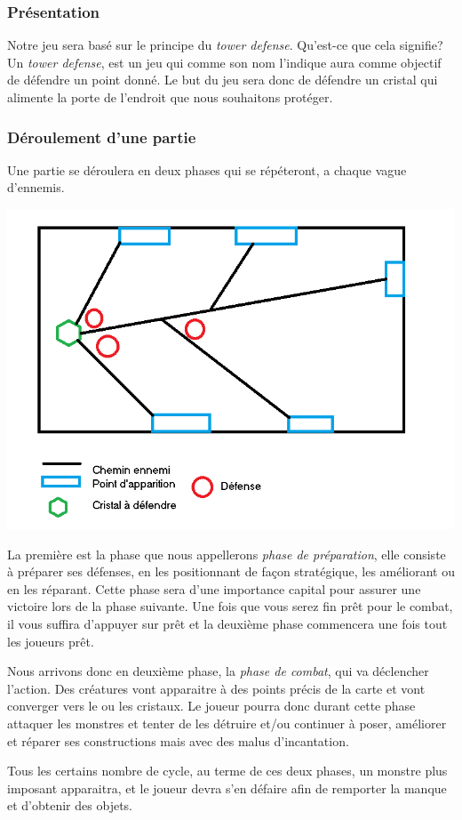 \documentclass[a4paper, 12pt]{article}
\begin{document}
		\subsubsection{Présentation}
		\par Notre jeu sera basé sur le principe du \textit{tower defense}. Qu'est-ce que 			cela signifie? Un \textit{tower defense}, est un jeu qui comme son nom l'indique 			aura comme objectif de défendre un point donné. Le but du jeu sera donc de défendre 		un cristal qui alimente la porte de l'endroit que nous souhaitons protéger.  
		\subsubsection{Déroulement d'une partie}
		Une partie se déroulera en deux phases qui se répéteront, a chaque vague d'ennemis.\\
		\centerline{\includegraphics[scale=0.55]{Plan.png}}
		\par La première est la phase que nous appellerons \textit{phase de préparation}, elle consiste à préparer ses défenses, en les positionnant de façon stratégique, les améliorant ou en les réparant. Cette phase sera d'une importance capital pour assurer une victoire lors de la phase suivante. Une fois que vous serez fin prêt pour le combat, il vous suffira d'appuyer sur prêt et la deuxième phase commencera une fois tout les joueurs prêt.
		\par Nous arrivons donc en deuxième phase, la \textit{phase de combat}, qui va déclencher l'action. Des créatures vont apparaitre à des points précis de la carte et vont converger vers le ou les cristaux. Le joueur pourra donc durant cette phase attaquer les monstres et tenter de les détruire et/ou continuer à poser, améliorer et réparer ses constructions mais avec des malus d'incantation.
		\par Tous les certains nombre de cycle, au terme de ces deux phases, un monstre plus imposant apparaitra, et le joueur devra s'en défaire afin de remporter la manque et d'obtenir des objets.
\end{document}
